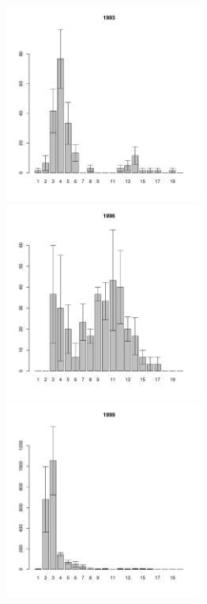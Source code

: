 \documentclass[12pt, a4paper]{article}
\begin{document}
\begin{figure}[h]
\begin{multicols}{3}
\end{multicols}



\begin{multicols}{3}
\hfill
\includegraphics[width=65mm]{../White_Sea/Estuatiy_Luvenga/sizestr_1993_.pdf}
\hfill
\includegraphics[width=65mm]{../White_Sea/Estuatiy_Luvenga/sizestr_1996_.pdf}
\hfill
\includegraphics[width=65mm]{../White_Sea/Estuatiy_Luvenga/sizestr_1999_.pdf}

\end{multicols}



\end{figure}
\end{document}
